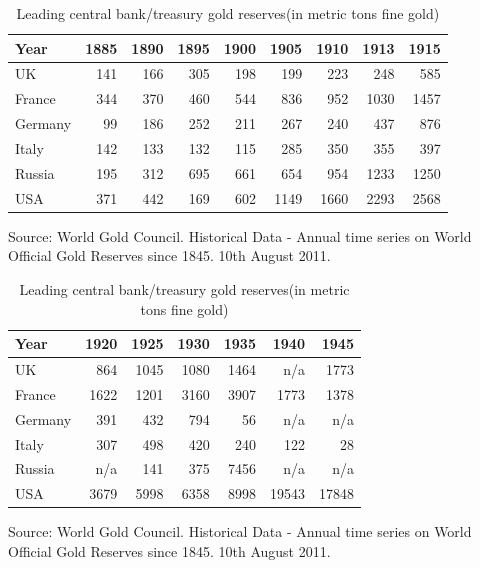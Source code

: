 \documentclass[international_finance_p1.tex]{subfiles}
\begin{document}
\begin{frame}
\begin{table}[htbp]
  \centering
  \fontsize{6pt}{6pt}\selectfont
  \caption{Leading central bank/treasury gold reserves(in metric tons fine gold)}
    \begin{tabular}{lrrrrrrrr}
    \toprule
    Year  & 1885  & 1890  & 1895  & 1900  & 1905  & 1910  & 1913  & 1915 \\
    \midrule
UK    & 141   & 166   & 305   & 198   & 199   & 223   & 248   & 585 \\
    France & 344   & 370   & 460   & 544   & 836   & 952   & 1030  & 1457 \\
    Germany & 99    & 186   & 252   & 211   & 267   & 240   & 437   & 876 \\
    Italy & 142   & 133   & 132   & 115   & 285   & 350   & 355   & 397 \\
    Russia & 195   & 312   & 695   & 661   & 654   & 954   & 1233  & 1250 \\
    USA   & 371   & 442   & 169   & 602   & 1149  & 1660  & 2293  & 2568 \\
    \bottomrule
    \end{tabular}%
  \label{tab:addlabel}%

\raggedright
\footnotesize
Source: World Gold Council. Historical Data - Annual time series on 
World Official Gold Reserves since 1845. 10th August 2011.
\end{table}%

\end{frame}

\begin{frame}
\begin{table}[htbp]
  \centering
  \fontsize{6pt}{6pt}\selectfont
  \caption{Leading central bank/treasury gold reserves(in metric tons fine gold)}
    \begin{tabular}{lrrrrrr}
    \toprule
    Year  & 1920  & 1925  & 1930  & 1935  & 1940  & 1945 \\
    \midrule
UK    & 864   & 1045  & 1080  & 1464  & n/a   & 1773 \\
    France & 1622  & 1201  & 3160  & 3907  & 1773  & 1378 \\
    Germany & 391   & 432   & 794   & 56    & n/a   & n/a \\
    Italy & 307   & 498   & 420   & 240   & 122   & 28 \\
    Russia & n/a   & 141   & 375   & 7456  & n/a   & n/a \\
    USA   & 3679  & 5998  & 6358  & 8998  & 19543 & 17848 \\
    \bottomrule
    \end{tabular}%
  \label{tab:addlabel}%

\raggedright
\footnotesize
Source: World Gold Council. Historical Data - Annual time series on 
World Official Gold Reserves since 1845. 10th August 2011.
\end{table}%
\end{frame}
\end{document}
